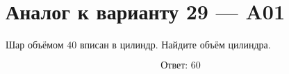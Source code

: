 \documentclass[12pt,a4paper]{article}
\begin{document}
\section*{Аналог к варианту 29 — A01}

Шар объёмом \(40\) вписан в цилиндр. Найдите объём цилиндра.

\begin{center}
\end{center}

\[
\boxed{\text{Ответ: }60}
\]
\end{document}
